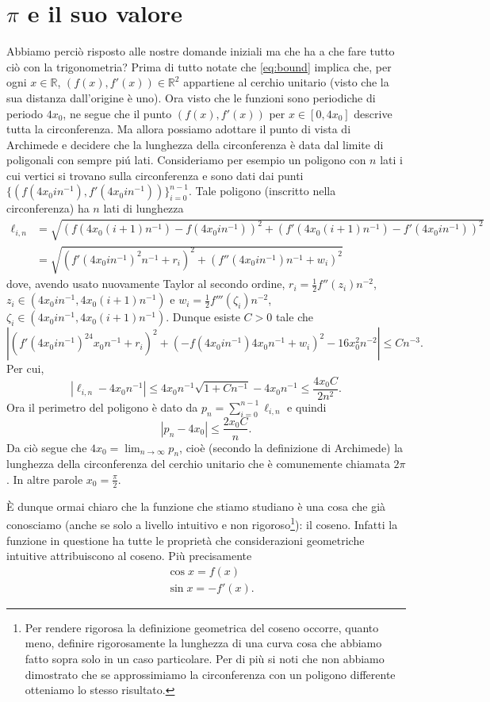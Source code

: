 \documentclass{amsart}
\numberwithin{equation}{section}
\newcommand\bR{{\mathbb R}}
\begin{document}
\section{{\Large $\pi$} e il suo valore}
Abbiamo perci\`o risposto alle nostre domande iniziali ma che ha a che fare tutto ci\`o con la trigonometria? Prima di tutto notate che \eqref{eq:bound} implica che, per ogni $x\in\bR$, $(f(x),f'(x))\in\bR^2$ appartiene al cerchio unitario (visto che la sua distanza dall'origine \`e uno).
Ora visto che le funzioni sono periodiche di periodo $4x_0$, ne segue che il punto $(f(x),f'(x))$ per $x\in [0, 4x_0]$ descrive tutta la circonferenza. Ma allora possiamo adottare il punto di vista di Archimede e decidere che la lunghezza della circonferenza \`e data dal limite di poligonali con sempre pi\'u lati. Consideriamo per esempio un poligono con $n$ lati i cui vertici si trovano sulla circonferenza e sono dati dai punti $\{(f(4x_0i n^{-1}),f'(4x_0i n^{-1}))\}_{i=0}^{n-1}$. Tale poligono (inscritto nella circonferenza) ha $n$ lati di lunghezza
\[
\begin{split}
\ell_{i,n}&=\sqrt{(f(4x_0(i+1) n^{-1})-f(4x_0i n^{-1}))^2+(f'(4x_0(i+1) n^{-1})-f'(4x_0i n^{-1}))^2}\\
&=\sqrt{(f'(4x_0i n^{-1})^2n^{-1}+r_i)^2+(f''(4x_0i n^{-1}) n^{-1}+w_i)^2}
\end{split}
\]
dove, avendo usato nuovamente Taylor al secondo ordine, $r_i=\frac 12 f''(z_i)n^{-2}$, $z_i\in (4x_0i n^{-1},4x_0(i+1) n^{-1})$ e $w_i=\frac 12 f'''(\zeta_i)n^{-2}$, $\zeta_i\in (4x_0i n^{-1},4x_0(i+1) n^{-1})$. Dunque esiste $C>0$ tale che
\[
\left|(f'(4x_0i n^{-1})^24x_0n^{-1}+r_i)^2+(-f(4x_0i n^{-1}) 4x_0n^{-1}+w_i)^2-16x_0^2n^{-2}\right|\leq Cn^{-3}.
\]
Per cui,
\[
|\ell_{i,n}-4x_0n^{-1}|\leq 4x_0n^{-1}\sqrt{1+Cn^{-1}}-4x_0n^{-1}\leq \frac {4x_0C}{2n^2}.
\]
Ora il perimetro del poligono \`e dato da $p_n=\sum_{i=0}^{n-1}\ell_{i,n}$ e quindi
\[
|p_n-4x_0|\leq \frac {2x_0C}{n}.
\]
Da ci\`o segue che $4x_0=\lim_{n\to\infty}p_n$, cio\`e (secondo la definizione di Archimede) la lunghezza della circonferenza del cerchio unitario che \`e comunemente chiamata $2\pi$. In altre parole $x_0=\frac {\pi}2$.

\`E dunque ormai chiaro che la funzione che stiamo studiano \`e una cosa che gi\`a conosciamo (anche se solo a livello intuitivo e non rigoroso\footnote{Per rendere rigorosa la definizione geometrica del coseno occorre, quanto meno, definire rigorosamente la lunghezza di una curva cosa che abbiamo fatto sopra solo in un caso particolare. Per di pi\`u si noti che non abbiamo dimostrato che se approssimiamo la circonferenza con un poligono differente otteniamo lo stesso risultato.}): il coseno. Infatti la funzione in questione ha tutte le propriet\`a che considerazioni geometriche intuitive attribuiscono al coseno. Pi\`u precisamente
\[
\begin{split}
&\cos x=f(x)\\
&\sin x=-f'(x).
\end{split}
\]
\end{document}
